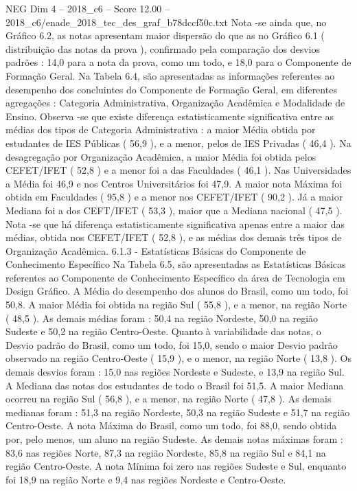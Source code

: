 \begin{textsample}{NEG Dim 4 – 2018\_c6 – Score 12.00 – 2018\_c6/enade\_2018\_tec\_des\_graf\_b78dccf50c.txt}
Nota -se ainda que, no Gráfico 6.2, as notas apresentam maior dispersão do que as no Gráfico 6.1 ( distribuição das notas da prova ), confirmado pela comparação dos desvios padrões : 14,0 para a nota da prova, como um todo, e 18,0 para o Componente de Formação Geral.
Na Tabela 6.4, são apresentadas as informações referentes ao desempenho dos concluintes do Componente de Formação Geral, em diferentes agregações : Categoria Administrativa, Organização Acadêmica e Modalidade de Ensino.
Observa -se que existe diferença estatisticamente significativa entre as médias dos tipos de Categoria Administrativa : a maior Média obtida por estudantes de IES Públicas ( 56,9 ), e a menor, pelos de IES Privadas ( 46,4 ).
Na desagregação por Organização Acadêmica, a maior Média foi obtida pelos CEFET/IFET ( 52,8 ) e a menor foi a das Faculdades ( 46,1 ).
Nas Universidades a Média foi 46,9 e nos Centros Universitários foi 47,9.
A maior nota Máxima foi obtida em Faculdades ( 95,8 ) e a menor nos CEFET/IFET ( 90,2 ).
Já a maior Mediana foi a dos CEFT/IFET ( 53,3 ), maior que a Mediana nacional ( 47,5 ).
Nota -se que há diferença estatisticamente significativa apenas entre a maior das médias, obtida nos CEFET/IFET ( 52,8 ), e as médias dos demais três tipos de Organização Acadêmica. 6.1.3 - Estatísticas Básicas do Componente de Conhecimento Específico Na Tabela 6.5, são apresentadas as Estatísticas Básicas referentes ao Componente de Conhecimento Específico da área de Tecnologia em Design Gráfico.
A Média do desempenho dos alunos do Brasil, como um todo, foi 50,8.
A maior Média foi obtida na região Sul ( 55,8 ), e a menor, na região Norte ( 48,5 ).
As demais médias foram : 50,4 na região Nordeste, 50,0 na região Sudeste e 50,2 na região Centro-Oeste.
Quanto à variabilidade das notas, o Desvio padrão do Brasil, como um todo, foi 15,0, sendo o maior Desvio padrão observado na região Centro-Oeste ( 15,9 ), e o menor, na região Norte ( 13,8 ).
Os demais desvios foram : 15,0 nas regiões Nordeste e Sudeste, e 13,9 na região Sul.
A Mediana das notas dos estudantes de todo o Brasil foi 51,5.
A maior Mediana ocorreu na região Sul ( 56,8 ), e a menor, na região Norte ( 47,8 ).
As demais medianas foram : 51,3 na região Nordeste, 50,3 na região Sudeste e 51,7 na região Centro-Oeste.
A nota Máxima do Brasil, como um todo, foi 88,0, sendo obtida por, pelo menos, um aluno na região Sudeste.
As demais notas máximas foram : 83,6 nas regiões Norte, 87,3 na região Nordeste, 85,8 na região Sul e 84,1 na região Centro-Oeste.
A nota Mínima foi zero nas regiões Sudeste e Sul, enquanto foi 18,9 na região Norte e 9,4 nas regiões Nordeste e Centro-Oeste.

\end{textsample}
